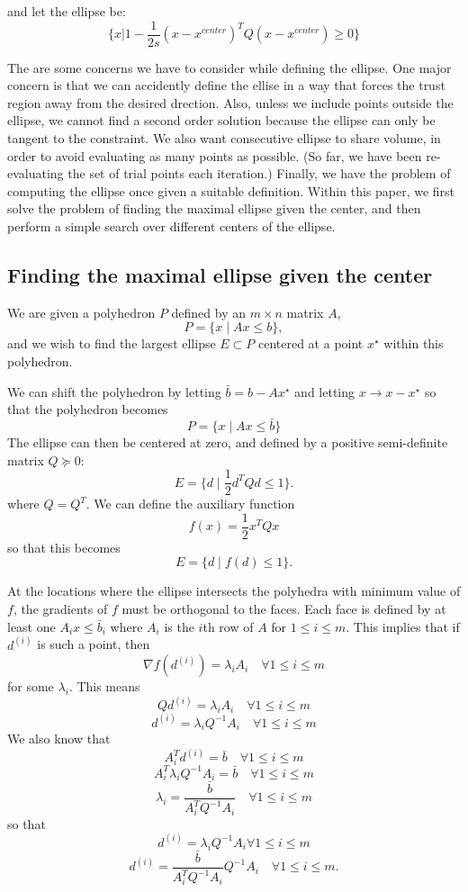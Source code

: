 \documentclass{article}
\begin{document}
and let the ellipse be:
$$\{x | 1 - \frac 1 {2s} (x - x^{center})^T Q (x - x^{center}) \ge 0\} $$


The are some concerns we have to consider while defining the ellipse.
One major concern is that we can accidently define the ellise in a way that forces the trust region away from the desired drection.
Also, unless we include points outside the ellipse, we cannot find a second order solution because the ellipse can only be tangent to the constraint.
We also want consecutive ellipse to share volume, in order to avoid evaluating as many points as possible.
(So far, we have been re-evaluating the set of trial points each iteration.)
Finally, we have the problem of computing the ellipse once given a suitable definition.
Within this paper, we first solve the problem of finding the maximal ellipse given the center, and then perform a simple search over different centers of the ellipse.

\subsection{Finding the maximal ellipse given the center}




We are given a polyhedron $P$ defined by an $m \times n$ matrix $A$,
\[
P = \{ x \; | \;  Ax \le b \},
\]
and we wish to find the largest ellipse $E \subset P$ centered at a point $x^{\star}$ within this polyhedron.

We can shift the polyhedron by letting $\bar{b} = b - Ax^{\star}$ and letting $x \to x - x^{\star}$ so that the polyhedron becomes
\[
P = \{ x \; | \;  Ax \le \bar{b} \}
\]
The ellipse can then be centered at zero, and defined by a positive semi-definite matrix $Q \succeq 0$:
\[
E = \{ d \; | \; \frac 1 2 d^T Q d \le 1 \}.
\]
where $Q = Q^T$.
We can define the auxiliary function 
\[
f(x) = \frac 1 2 x^T Q x
\]
so that this becomes
\[
E = \{ d \; | \; f(d) \le 1 \}.
\]


At the locations where the ellipse intersects the polyhedra with minimum value of $f$, the gradients of $f$ must be orthogonal to the faces.
Each face is defined by at least one $A_i x \le \bar{b}_i$ where $A_i$ is the $i$th row of $A$ for $1\le i \le m$.
This implies that if $d^{(i)}$ is such a point, then
\[
\nabla f(d^{(i)}) = \lambda_i A_i \quad \forall 1\le i\le m
\]
for some $\lambda_i$.
This means
\[
Q d^{(i)} = \lambda_i A_i \quad \forall 1\le i\le m
\]
\[
d^{(i)} = \lambda_i Q^{-1}A_i \quad \forall 1\le i\le m
\]
We also know that 
\[
A_i^T d^{(i)} = \bar{b} \quad \forall 1\le i\le m
\]
\[
A_i^T \lambda_i Q^{-1}A_i = \bar{b} \quad \forall 1\le i\le m
\]
\[
\lambda_i = \frac {\bar{b}}{A_i^T  Q^{-1}A_i} \quad \forall 1\le i\le m
\]
so that 
\[
d^{(i)} = \lambda_i Q^{-1}A_i \forall 1\le i\le m
\]
\[
d^{(i)} = \frac {\bar{b}}{A_i^T  Q^{-1}A_i}  Q^{-1}A_i \quad \forall 1\le i\le m.
\]
\end{document}
